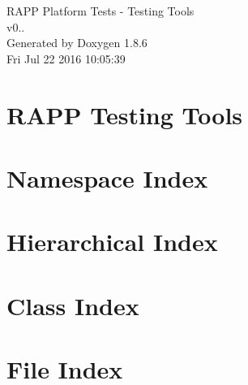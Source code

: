 \documentclass[twoside]{book}
\newcommand{\clearemptydoublepage}{%
  \newpage{\pagestyle{empty}\cleardoublepage}%
}
\begin{document}
\hypersetup{pageanchor=false}
\begin{titlepage}
\vspace*{7cm}
\begin{center}%
{\Large R\-A\-P\-P Platform Tests -\/ Testing Tools \\[1ex]\large v0.. }\\
\vspace*{1cm}
{\large Generated by Doxygen 1.8.6}\\
\vspace*{0.5cm}
{\small Fri Jul 22 2016 10:05:39}\\
\end{center}
\end{titlepage}
\clearemptydoublepage
\tableofcontents
\clearemptydoublepage
{}
\hypersetup{pageanchor=true}

\chapter{R\-A\-P\-P Testing Tools}
\label{md__home_travis_rapp_temp_rapp-platform_rapp_testing_tools_README}
\hypertarget{md__home_travis_rapp_temp_rapp-platform_rapp_testing_tools_README}{}

\chapter{Namespace Index}

\chapter{Hierarchical Index}

\chapter{Class Index}

\chapter{File Index}

\end{document}
